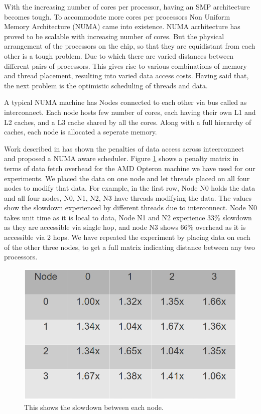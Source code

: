 With the increasing number of cores per processor, having an SMP architecture becomes tough.
To accommodate more cores per processors Non Uniform Memory Architecture (NUMA) came into existence.
NUMA acrhitecture has proved to be scalable with increasing number of cores.
But the physical arrangement of the processors on the chip, so that they are equidistant from each other is a tough problem.
Due to which there are varied distances between different pairs of processors.
This gives rise to various combinations of memory and thread placement, resulting into varied data access costs.
Having said that, the next problem is the optimistic scheduling of threads and data.

A typical NUMA machine has Nodes connected to each other via bus called as interconnect.
Each node hosts few number of cores, each having their own L1 and L2 caches, and a L3 cache shared by all the cores.
Along with a full hierarchy of caches, each node is allocated a seperate memory.

Work described in \cite{Majo:2011:MMN:1993478.1993481} has shown the penalties of data access across inteerconnect and proposed a NUMA aware scheduler.
Figure \ref{fig:numaMatrix} shows a penalty matrix in terms of data fetch overhead for the AMD Opteron machine we have used for our experiments.
We placed the data on one node and let threads placed on all four nodes to modify that data.
For example, in the first row, Node N0 holds the data and all four nodes, N0, N1, N2, N3 have threads modifying the data.
The values show the slowdown experienced by different threads due to interconnect.
Node N0 takes unit time as it is local to data, Node N1 and N2 experience 33\% slowdown as they are accessible via single hop, and node N3 shows 66\% overhead as it is accessible via 2 hops.
We have repeated the experiment by placing data on each of the other three nodes, to get a full matrix indicating distance between any two processors.

\begin{figure}
    \centering
    \includegraphics[scale=0.35]{numaMatrix.png}
    \caption{This shows the slowdown between each node. }
    \label{fig:numaMatrix}
\end{figure}

